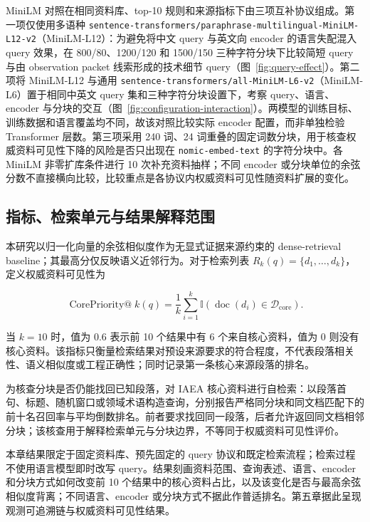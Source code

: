 MiniLM 对照在相同资料库、top-10 规则和来源指标下由三项互补协议组成。第一项仅使用多语种 \nolinkurl{sentence-transformers/paraphrase-multilingual-MiniLM-L12-v2}（MiniLM-L12）：为避免将中文 query 与英文向 encoder 的语言失配混入 query 效果，在 800/80、1200/120 和 1500/150 三种字符分块下比较简短 query 与由 observation packet 线索形成的技术细节 query（图~\ref{fig:query-effect}）。第二项将 MiniLM-L12 与通用 \nolinkurl{sentence-transformers/all-MiniLM-L6-v2}（MiniLM-L6）置于相同中英文 query 集和三种字符分块设置下，考察 query、语言、encoder 与分块的交互（图~\ref{fig:configuration-interaction}）。两模型的训练目标、训练数据和语言覆盖均不同，故该对照比较实际 encoder 配置，而非单独检验 Transformer 层数。第三项采用 240 词、24 词重叠的固定词数分块，用于核查权威资料可见性下降的风险是否只出现在 \texttt{nomic-embed-text} 的字符分块中。各 MiniLM 非零扩库条件进行 10 次补充资料抽样；不同 encoder 或分块单位的余弦分数不直接横向比较，比较重点是各协议内权威资料可见性随资料扩展的变化。

\subsection{指标、检索单元与结果解释范围}

本研究以归一化向量的余弦相似度作为无显式证据来源约束的 dense-retrieval baseline；其最高分仅反映语义近邻行为。对于检索列表 $R_k(q)=\{d_1,\ldots,d_k\}$，定义权威资料可见性为

\[
\operatorname{CorePriority@}k(q)=
\frac{1}{k}\sum_{i=1}^{k}
\mathbb{I}\!\left(\operatorname{doc}(d_i)\in\mathcal{D}_{\mathrm{core}}\right).
\]

当 $k=10$ 时，值为 0.6 表示前 10 个结果中有 6 个来自核心资料，值为 0 则没有核心资料。该指标只衡量检索结果对预设来源要求的符合程度，不代表段落相关性、语义相似度或工程正确性；同时记录第一条核心来源段落的排名。

为核查分块是否仍能找回已知段落，对 IAEA 核心资料进行自检索：以段落首句、标题、随机窗口或领域术语构造查询，分别报告严格同分块和同文档匹配下的前十名召回率与平均倒数排名。前者要求找回同一段落，后者允许返回同文档相邻分块；该核查用于解释检索单元与分块边界，不等同于权威资料可见性评价。

本章结果限定于固定资料库、预先固定的 query 协议和既定检索流程；检索过程不使用语言模型即时改写 query。结果刻画资料范围、查询表述、语言、encoder 和分块方式如何改变前 10 个结果中的核心资料占比，以及该变化是否与最高余弦相似度背离；不同语言、encoder 或分块方式不据此作普适排名。第五章据此呈现观测可追溯链与权威资料可见性结果。
